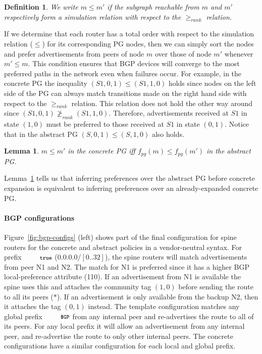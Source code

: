 \documentclass[numbers, 10pt, preprint]{sigplanconf}
\newcommand{\para}[1]{\paragraph*{\textbf{#1}}}
\newcommand{\CD}[1]{\texttt{\small #1}}  %
\newcommand{\True}{\CD{true}}
\newtheorem{defn}{Definition}[section]
\newtheorem{lem}[thm]{Lemma}
\begin{document}
\begin{defn}
We write $m \leq m'$ if the subgraph reachable from $m$ and $m'$ respectively form a simulation relation with respect to the $\geq_{rank}$ relation.
\end{defn}

If we determine that each router has a total order with respect to the simulation relation ($\leq$) for its corresponding PG nodes, then we can simply sort the nodes and prefer advertisements from peers of node $m$ over those of node $m'$ whenever $m' \leq m$. This condition ensures that BGP devices will converge to the most preferred paths in the network even when failures occur.
%
For example, in the concrete PG the inequality $(S1,0,1) \leq (S1,1,0)$ holds since nodes on the left side of the PG can always match transitions made on the right hand side with respect to the $\geq_{rank}$ relation. This relation does not hold the other way around since $(S1,0,1) \ngeq_{rank} (S1,1,0)$. Therefore, advertisements received at $S1$ in state $(1,0)$ must be preferred to those received at $S1$ in state $(0,1)$.
%
Notice that in the abstract PG $(S,0,1) \leq (S,1,0)$ also holds.

\begin{lem}
\label{lem:preference}
$m \leq m'$ in the concrete PG iff $f_{pg}(m) \leq f_{pg}(m')$ in the abstract PG.
\end{lem}

Lemma~\ref{lem:preference} tells us that inferring preferences over the abstract PG before concrete expansion is equivalent to inferring preferences over an already-expanded concrete PG.


\para{BGP configurations}

Figure~\ref{fig:bgp-configs} (left) shows part of the final configuration for spine routers for the concrete and abstract policies in a vendor-neutral syntax.
%
For prefix $\True$ ($0.0.0.0/[0..32]$), the spine routers will match advertisements from peer N1 and N2. The match for N1 is preferred since it has a higher BGP local-preference attribute (110). If an advertisement from N1 is available the spine uses this and attaches the community tag $(1,0)$ before sending the route to all its peers ($*$). If an advertisement is only available from the backup N2, then it attaches the tag $(0,1)$ instead.
%
The template configuration matches any global prefix $\CD{\$GP}$ from any internal peer and re-advertises the route to all of its peers. For any local prefix it will allow an advertisement from any internal peer, and re-advertise the route to only other internal peers. The concrete configurations have a similar configuration for each local and global prefix.
\end{document}

